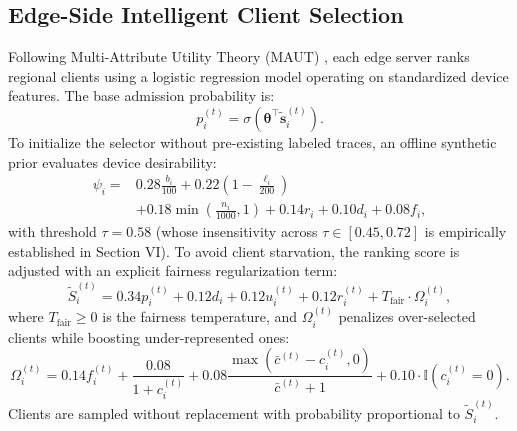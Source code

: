 \documentclass[conference]{IEEEtran}
\begin{document}
\subsection{Edge-Side Intelligent Client Selection}
Following Multi-Attribute Utility Theory (MAUT) \cite{nishio2019client,lai2021oort}, each edge server ranks regional clients using a logistic regression model operating on standardized device features. The base admission probability is:
\begin{equation}
p_i^{(t)} = \sigma \left(\boldsymbol{\theta}^{\top}\tilde{\mathbf{s}}_i^{(t)} \right).
\end{equation}
To initialize the selector without pre-existing labeled traces, an offline synthetic prior evaluates device desirability:
\begin{equation}
\begin{aligned}
\psi_i ={}& 0.28 \frac{b_i}{100} + 0.22\left(1 - \frac{\ell_i}{200}\right) \\
&+ 0.18 \min\left(\frac{n_i}{1000},1\right) + 0.14 r_i + 0.10 d_i + 0.08 f_i,
\end{aligned}
\end{equation}
with threshold $\tau = 0.58$ (whose insensitivity across $\tau \in [0.45, 0.72]$ is empirically established in Section VI). To avoid client starvation, the ranking score is adjusted with an explicit fairness regularization term:
\begin{equation}
\tilde{S}_i^{(t)} = 0.34 p_i^{(t)} + 0.12 d_i + 0.12 u_i^{(t)} + 0.12 r_i^{(t)} + T_{\mathrm{fair}} \cdot \Omega_i^{(t)},
\end{equation}
where $T_{\mathrm{fair}} \ge 0$ is the fairness temperature, and $\Omega_i^{(t)}$ penalizes over-selected clients while boosting under-represented ones:
\begin{equation}
\Omega_i^{(t)} = 0.14 f_i^{(t)} + \frac{0.08}{1 + c_i^{(t)}} + 0.08 \frac{\max(\bar{c}^{(t)} - c_i^{(t)}, 0)}{\bar{c}^{(t)} + 1} + 0.10 \cdot \mathbb{I}(c_i^{(t)}=0).
\end{equation}
Clients are sampled without replacement with probability proportional to $\tilde{S}_i^{(t)}$.
\end{document}
